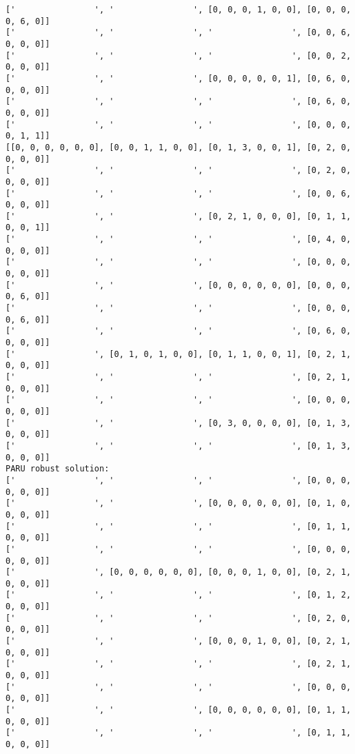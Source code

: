 \documentclass[10pt]{article}
\theoremstyle{plain}
\theoremstyle{definition}
\theoremstyle{remark}
\begin{document}
\begin{minipage}[t]{8cm}
\begin{verbatim}
['                ', '                ', [0, 0, 0, 1, 0, 0], [0, 0, 0, 0, 6, 0]]
['                ', '                ', '                ', [0, 0, 6, 0, 0, 0]]
['                ', '                ', '                ', [0, 0, 2, 0, 0, 0]]
['                ', '                ', [0, 0, 0, 0, 0, 1], [0, 6, 0, 0, 0, 0]]
['                ', '                ', '                ', [0, 6, 0, 0, 0, 0]]
['                ', '                ', '                ', [0, 0, 0, 0, 1, 1]]
[[0, 0, 0, 0, 0, 0], [0, 0, 1, 1, 0, 0], [0, 1, 3, 0, 0, 1], [0, 2, 0, 0, 0, 0]]
['                ', '                ', '                ', [0, 2, 0, 0, 0, 0]]
['                ', '                ', '                ', [0, 0, 6, 0, 0, 0]]
['                ', '                ', [0, 2, 1, 0, 0, 0], [0, 1, 1, 0, 0, 1]]
['                ', '                ', '                ', [0, 4, 0, 0, 0, 0]]
['                ', '                ', '                ', [0, 0, 0, 0, 0, 0]]
['                ', '                ', [0, 0, 0, 0, 0, 0], [0, 0, 0, 0, 6, 0]]
['                ', '                ', '                ', [0, 0, 0, 0, 6, 0]]
['                ', '                ', '                ', [0, 6, 0, 0, 0, 0]]
['                ', [0, 1, 0, 1, 0, 0], [0, 1, 1, 0, 0, 1], [0, 2, 1, 0, 0, 0]]
['                ', '                ', '                ', [0, 2, 1, 0, 0, 0]]
['                ', '                ', '                ', [0, 0, 0, 0, 0, 0]]
['                ', '                ', [0, 3, 0, 0, 0, 0], [0, 1, 3, 0, 0, 0]]
['                ', '                ', '                ', [0, 1, 3, 0, 0, 0]]
PARU robust solution:
['                ', '                ', '                ', [0, 0, 0, 0, 0, 0]]
['                ', '                ', [0, 0, 0, 0, 0, 0], [0, 1, 0, 0, 0, 0]]
['                ', '                ', '                ', [0, 1, 1, 0, 0, 0]]
['                ', '                ', '                ', [0, 0, 0, 0, 0, 0]]
['                ', [0, 0, 0, 0, 0, 0], [0, 0, 0, 1, 0, 0], [0, 2, 1, 0, 0, 0]]
['                ', '                ', '                ', [0, 1, 2, 0, 0, 0]]
['                ', '                ', '                ', [0, 2, 0, 0, 0, 0]]
['                ', '                ', [0, 0, 0, 1, 0, 0], [0, 2, 1, 0, 0, 0]]
['                ', '                ', '                ', [0, 2, 1, 0, 0, 0]]
['                ', '                ', '                ', [0, 0, 0, 0, 0, 0]]
['                ', '                ', [0, 0, 0, 0, 0, 0], [0, 1, 1, 0, 0, 0]]
['                ', '                ', '                ', [0, 1, 1, 0, 0, 0]]

\end{verbatim}
\end{minipage}
\end{document}
